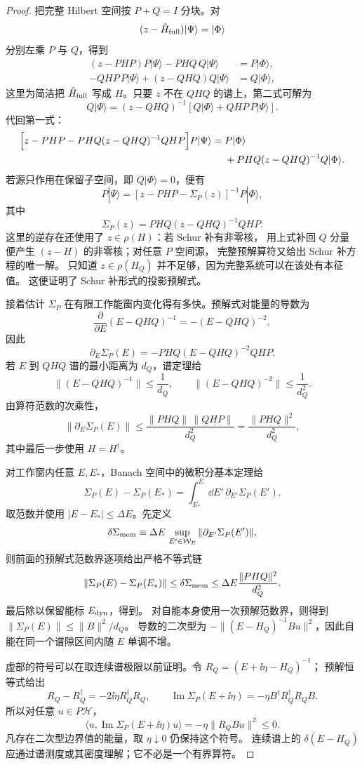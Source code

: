 \begin{proof}
把完整 Hilbert 空间按 $P+Q=I$ 分块。对
\[
(z-\hat H_{\rm full})|\Psi\rangle=|\Phi\rangle
\]
分别左乘 $P$ 与 $Q$，得到
\begin{align*}
(z-PHP)P|\Psi\rangle-PHQ\,Q|\Psi\rangle
&=P|\Phi\rangle,\\
-QHP\,P|\Psi\rangle+(z-QHQ)Q|\Psi\rangle
&=Q|\Phi\rangle,
\end{align*}
这里为简洁把 $\hat H_{\rm full}$ 写成 $H$。只要 $z$ 不在 $QHQ$ 的谱上，第二式可解为
\[
Q|\Psi\rangle
=(z-QHQ)^{-1}
\left[
Q|\Phi\rangle+QHP\,P|\Psi\rangle
\right].
\]
代回第一式：
\begin{align*}
\Bigl[
z-PHP
-PHQ(z-QHQ)^{-1}QHP
\Bigr]P|\Psi\rangle
={}&P|\Phi\rangle\\
&+PHQ(z-QHQ)^{-1}Q|\Phi\rangle .
\end{align*}
若源只作用在保留子空间，即 $Q|\Phi\rangle=0$，便有
\[
P|\Psi\rangle
=
\left[
z-PHP-\Sigma_P(z)
\right]^{-1}P|\Phi\rangle,
\]
其中
\[
\Sigma_P(z)
=
PHQ(z-QHQ)^{-1}QHP.
\]
这里的逆存在还使用了 $z\in\rho(H)$：若 Schur 补有非零核，
用上式补回 $Q$ 分量便产生 $(z-H)$ 的非零核；对任意 $P$ 空间源，
完整预解算符又给出 Schur 补方程的唯一解。
只知道 $z\in\rho(H_Q)$ 并不足够，因为完整系统可以在该处有本征值。
这便证明了 Schur 补形式的投影预解式。

接着估计 $\Sigma_P$ 在有限工作能窗内变化得有多快。预解式对能量的导数为
\[
\frac{\partial}{\partial E}
(E-QHQ)^{-1}
=
-(E-QHQ)^{-2},
\]
因此
\[
\partial_E\Sigma_P(E)
=
-PHQ(E-QHQ)^{-2}QHP.
\]
若 $E$ 到 $QHQ$ 谱的最小距离为 $d_Q$，谱定理给
\[
\|(E-QHQ)^{-1}\|
\le\frac1{d_Q},
\qquad
\|(E-QHQ)^{-2}\|
\le\frac1{d_Q^2}.
\]
由算符范数的次乘性，
\[
\|\partial_E\Sigma_P(E)\|
\le
\frac{\|PHQ\|\,\|QHP\|}{d_Q^2}
=
\frac{\|PHQ\|^2}{d_Q^2},
\]
其中最后一步使用 $H=H^\dagger$。

对工作窗内任意 $E,E_*$，Banach 空间中的微积分基本定理给
\[
\Sigma_P(E)-\Sigma_P(E_*)
=
\int_{E_*}^{E}\dd E'\,
\partial_{E'}\Sigma_P(E').
\]
取范数并使用 $|E-E_*|\le\Delta E$。先定义
\[
\delta\Sigma_{\rm mem}
\equiv
\Delta E\,
\sup_{E'\in\mathcal W_E}
\|\partial_{E'}\Sigma_P(E')\|,
\]
则前面的预解式范数界逐项给出严格不等式链
\[
\|\Sigma_P(E)-\Sigma_P(E_*)\|
\le\delta\Sigma_{\rm mem}
\le
\Delta E\frac{\|PHQ\|^2}{d_Q^2}.
\]
最后除以保留能标 $E_{\rm dyn}$，得到。
对自能本身使用一次预解范数界，则得到 $\|\Sigma_P(E)\|\le\|B\|^2/d_Q$。
导数的二次型为 $-\|(E-H_Q)^{-1}Bu\|^2$，因此自能在同一个谱隙区间内随 $E$ 单调不增。

虚部的符号可以在取连续谱极限以前证明。令 $R_Q=(E+\ii\eta-H_Q)^{-1}$；
预解恒等式给出
\[
R_Q-R_Q^\dagger=-2\ii\eta R_Q^\dagger R_Q,\qquad
\operatorname{Im}\Sigma_P(E+\ii\eta)=-\eta B^\dagger R_Q^\dagger R_QB.
\]
所以对任意 $u\in P\mathcal H$，
\[
\langle u,\operatorname{Im}\Sigma_P(E+\ii\eta)u\rangle
=-\eta\|R_QBu\|^2\le0.
\]
凡存在二次型边界值的能量，取 $\eta\downarrow0$ 仍保持这个符号。
连续谱上的 $\delta(E-H_Q)$ 应通过谱测度或其密度理解；它不必是一个有界算符。
\end{proof}


